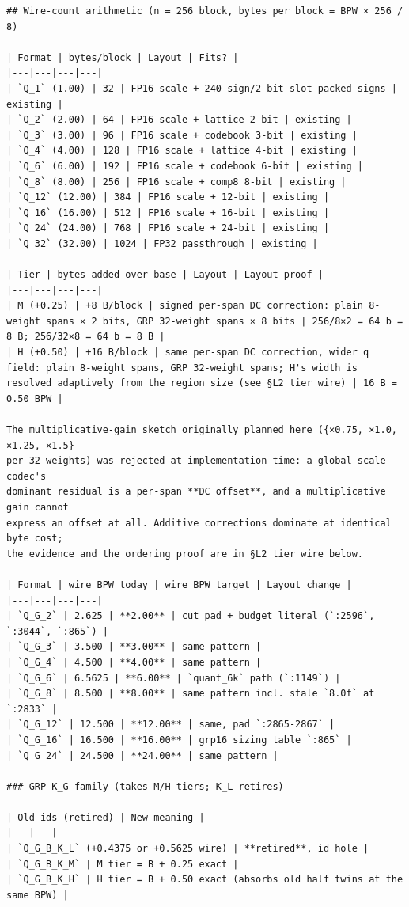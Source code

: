 \begin{verbatim}
## Wire-count arithmetic (n = 256 block, bytes per block = BPW × 256 / 8)

| Format | bytes/block | Layout | Fits? |
|---|---|---|---|
| `Q_1` (1.00) | 32 | FP16 scale + 240 sign/2-bit-slot-packed signs | existing |
| `Q_2` (2.00) | 64 | FP16 scale + lattice 2-bit | existing |
| `Q_3` (3.00) | 96 | FP16 scale + codebook 3-bit | existing |
| `Q_4` (4.00) | 128 | FP16 scale + lattice 4-bit | existing |
| `Q_6` (6.00) | 192 | FP16 scale + codebook 6-bit | existing |
| `Q_8` (8.00) | 256 | FP16 scale + comp8 8-bit | existing |
| `Q_12` (12.00) | 384 | FP16 scale + 12-bit | existing |
| `Q_16` (16.00) | 512 | FP16 scale + 16-bit | existing |
| `Q_24` (24.00) | 768 | FP16 scale + 24-bit | existing |
| `Q_32` (32.00) | 1024 | FP32 passthrough | existing |

| Tier | bytes added over base | Layout | Layout proof |
|---|---|---|---|
| M (+0.25) | +8 B/block | signed per-span DC correction: plain 8-weight spans × 2 bits, GRP 32-weight spans × 8 bits | 256/8×2 = 64 b = 8 B; 256/32×8 = 64 b = 8 B |
| H (+0.50) | +16 B/block | same per-span DC correction, wider q field: plain 8-weight spans, GRP 32-weight spans; H's width is resolved adaptively from the region size (see §L2 tier wire) | 16 B = 0.50 BPW |

The multiplicative-gain sketch originally planned here ({×0.75, ×1.0, ×1.25, ×1.5}
per 32 weights) was rejected at implementation time: a global-scale codec's
dominant residual is a per-span **DC offset**, and a multiplicative gain cannot
express an offset at all. Additive corrections dominate at identical byte cost;
the evidence and the ordering proof are in §L2 tier wire below.

| Format | wire BPW today | wire BPW target | Layout change |
|---|---|---|---|
| `Q_G_2` | 2.625 | **2.00** | cut pad + budget literal (`:2596`, `:3044`, `:865`) |
| `Q_G_3` | 3.500 | **3.00** | same pattern |
| `Q_G_4` | 4.500 | **4.00** | same pattern |
| `Q_G_6` | 6.5625 | **6.00** | `quant_6k` path (`:1149`) |
| `Q_G_8` | 8.500 | **8.00** | same pattern incl. stale `8.0f` at `:2833` |
| `Q_G_12` | 12.500 | **12.00** | same, pad `:2865-2867` |
| `Q_G_16` | 16.500 | **16.00** | grp16 sizing table `:865` |
| `Q_G_24` | 24.500 | **24.00** | same pattern |

### GRP K_G family (takes M/H tiers; K_L retires)

| Old ids (retired) | New meaning |
|---|---|
| `Q_G_B_K_L` (+0.4375 or +0.5625 wire) | **retired**, id hole |
| `Q_G_B_K_M` | M tier = B + 0.25 exact |
| `Q_G_B_K_H` | H tier = B + 0.50 exact (absorbs old half twins at the same BPW) |


\end{verbatim}
